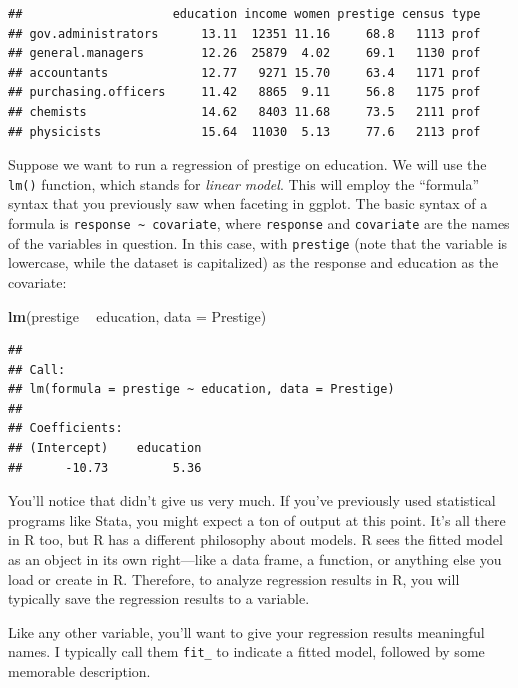 \documentclass[12pt,oneside,openany]{book}
\newenvironment{Shaded}{\begin{snugshade}}{\end{snugshade}}
\newcommand{\KeywordTok}[1]{\textcolor[rgb]{0.13,0.29,0.53}{\textbf{#1}}}
\newcommand{\DataTypeTok}[1]{\textcolor[rgb]{0.13,0.29,0.53}{#1}}
\newcommand{\StringTok}[1]{\textcolor[rgb]{0.31,0.60,0.02}{#1}}
\newcommand{\OperatorTok}[1]{\textcolor[rgb]{0.81,0.36,0.00}{\textbf{#1}}}
\newcommand{\NormalTok}[1]{#1}
\begin{document}
\begin{verbatim}
##                     education income women prestige census type
## gov.administrators      13.11  12351 11.16     68.8   1113 prof
## general.managers        12.26  25879  4.02     69.1   1130 prof
## accountants             12.77   9271 15.70     63.4   1171 prof
## purchasing.officers     11.42   8865  9.11     56.8   1175 prof
## chemists                14.62   8403 11.68     73.5   2111 prof
## physicists              15.64  11030  5.13     77.6   2113 prof
\end{verbatim}

Suppose we want to run a regression of prestige on education. We will
use the \texttt{lm()} function, which stands for \emph{linear model}.
This will employ the ``formula'' syntax that you previously saw when
faceting in ggplot. The basic syntax of a formula is
\texttt{response\ \textasciitilde{}\ covariate}, where \texttt{response}
and \texttt{covariate} are the names of the variables in question. In
this case, with \texttt{prestige} (note that the variable is lowercase,
while the dataset is capitalized) as the response and education as the
covariate:

\begin{Shaded}
\begin{Highlighting}[]
\KeywordTok{lm}\NormalTok{(prestige }\OperatorTok{~}\StringTok{ }\NormalTok{education, }\DataTypeTok{data =}\NormalTok{ Prestige)}
\end{Highlighting}
\end{Shaded}

\begin{verbatim}
## 
## Call:
## lm(formula = prestige ~ education, data = Prestige)
## 
## Coefficients:
## (Intercept)    education  
##      -10.73         5.36
\end{verbatim}

You'll notice that didn't give us very much. If you've previously used
statistical programs like Stata, you might expect a ton of output at
this point. It's all there in R too, but R has a different philosophy
about models. R sees the fitted model as an object in its own
right---like a data frame, a function, or anything else you load or
create in R. Therefore, to analyze regression results in R, you will
typically save the regression results to a variable.

Like any other variable, you'll want to give your regression results
meaningful names. I typically call them \texttt{fit\_} to indicate a
fitted model, followed by some memorable description.
\end{document}
